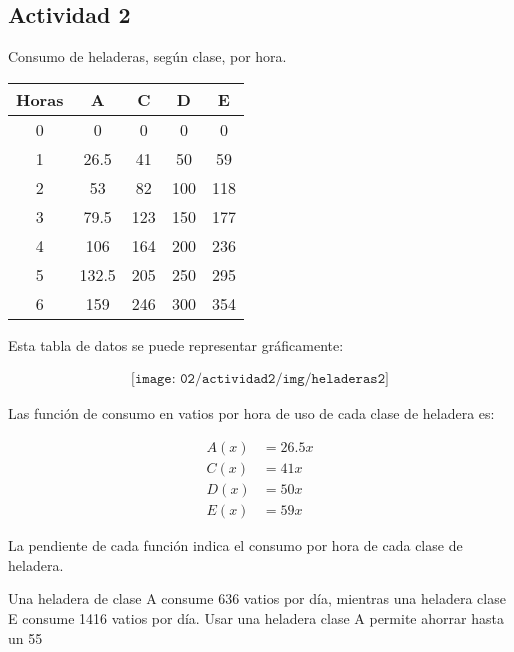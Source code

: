 \subsection*{Actividad 2}

Consumo de heladeras, según clase, por hora. 

\begin{center}
\begin{tabular}{ccccc}
Horas & A     & C   & D   & E   \\ \hline
0     & 0     & 0   & 0   & 0   \\
1     & 26.5  & 41  & 50  & 59  \\
2     & 53    & 82  & 100 & 118 \\
3     & 79.5  & 123 & 150 & 177 \\
4     & 106   & 164 & 200 & 236 \\
5     & 132.5 & 205 & 250 & 295 \\
6     & 159   & 246 & 300 & 354 \\ \hline
\end{tabular}
\end{center}

Esta tabla de datos se puede representar gráficamente:

\begin{align*}
	\texttt{[image: 02/actividad2/img/heladeras2]}
\end{align*}

Las función de consumo en vatios por hora de uso de cada clase de heladera es:

\begin{align*}
	A(x) &= 26.5x\\ 
	C(x) &= 41x\\ 
	D(x) &= 50x\\ 
	E(x) &= 59x
\end{align*}

La pendiente de cada función indica el consumo por hora de cada clase de heladera.

Una heladera de clase A consume 636 vatios por día, mientras una heladera clase E consume 1416 vatios por día. Usar una heladera clase A permite ahorrar hasta un 55%

